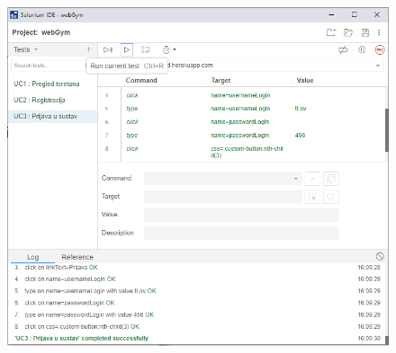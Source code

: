 				\begin{figure}[H]
        			\hspace*{-1.5cm}
        			\includegraphics[scale=0.5]{dijagrami/UC3.PNG} %
        			\centering
        			\label{fig:promjene}
	        	\end{figure}
				
